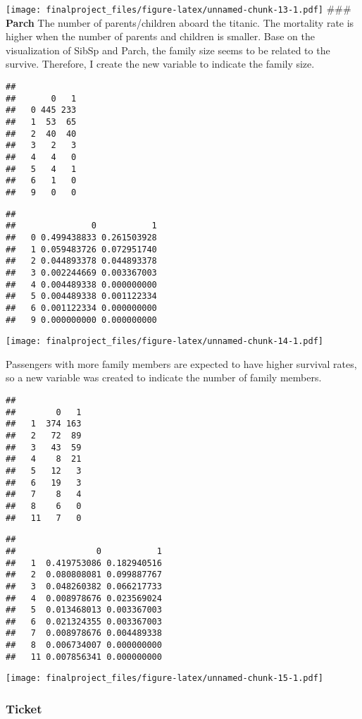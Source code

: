 \documentclass[
]{article}
\begin{document}
\texttt{[image: finalproject\_files/figure-latex/unnamed-chunk-13-1.pdf]}
\#\#\# \textbf{Parch} The number of parents/children aboard the titanic.
The mortality rate is higher when the number of parents and children is
smaller. Base on the visualization of SibSp and Parch, the family size
seems to be related to the survive. Therefore, I create the new variable
to indicate the family size.

\begin{verbatim}
##    
##       0   1
##   0 445 233
##   1  53  65
##   2  40  40
##   3   2   3
##   4   4   0
##   5   4   1
##   6   1   0
##   9   0   0
\end{verbatim}

\begin{verbatim}
##    
##               0           1
##   0 0.499438833 0.261503928
##   1 0.059483726 0.072951740
##   2 0.044893378 0.044893378
##   3 0.002244669 0.003367003
##   4 0.004489338 0.000000000
##   5 0.004489338 0.001122334
##   6 0.001122334 0.000000000
##   9 0.000000000 0.000000000
\end{verbatim}

\texttt{[image: finalproject\_files/figure-latex/unnamed-chunk-14-1.pdf]}

Passengers with more family members are expected to have higher survival
rates, so a new variable was created to indicate the number of family
members.

\begin{verbatim}
##     
##        0   1
##   1  374 163
##   2   72  89
##   3   43  59
##   4    8  21
##   5   12   3
##   6   19   3
##   7    8   4
##   8    6   0
##   11   7   0
\end{verbatim}

\begin{verbatim}
##     
##                0           1
##   1  0.419753086 0.182940516
##   2  0.080808081 0.099887767
##   3  0.048260382 0.066217733
##   4  0.008978676 0.023569024
##   5  0.013468013 0.003367003
##   6  0.021324355 0.003367003
##   7  0.008978676 0.004489338
##   8  0.006734007 0.000000000
##   11 0.007856341 0.000000000
\end{verbatim}

\texttt{[image: finalproject\_files/figure-latex/unnamed-chunk-15-1.pdf]}

\hypertarget{ticket}{%
\subsubsection{\texorpdfstring{\textbf{Ticket}}{Ticket}}\label{ticket}}
\end{document}
